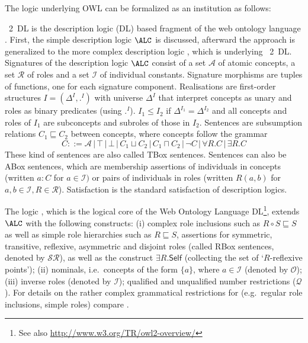 \documentclass[10pt, a4paper]{isov2}
\makeatletter
\newcommand*\CommentAuthor{}
\renewcommand*\CommentAuthor{#1}}
\newcommand*\CommentDate{}
\renewcommand*\CommentDate{#1}}
\newcommand*\CommentId{}
\renewcommand*\CommentId{#1}}
\newcommand*\CommentType{}
\renewcommand*\CommentType{#1}}
\newcommand*{\SetCommentColorByType}[1]{%
\edef\localType{{#1}}%
\expandafter\ifstrequal\localType{q-aut}{\colorlet{CommentColor}{red}}{%
\expandafter\ifstrequal\localType{q-all}{\colorlet{CommentColor}{orange}}{%
\expandafter\ifstrequal\localType{todo}{\colorlet{CommentColor}{orange}}{%
\expandafter\ifstrequal\localType{fyi}{\colorlet{CommentColor}{lightgray}}{%
\colorlet{CommentColor}{yellow}}}}}}
\newcommand*{\SetCommentPrefixByType}[1]{%
\edef\localType{{#1}}%
\expandafter\@ifmtarg\localType{%
\edef\CommentPrefix{}%
}{%
\caseupper[q]{#1}%
\edef\CommentPrefix{\thestring: }%
}}
\newcommand*{\initComment}[1]{%
\setkeys{Comment}{#1}%
\SetCommentColorByType{\CommentType}%
\relax%
\SetCommentPrefixByType{\CommentType}%
\relax%
}
\newcommand*{\todonote}[2][]{%
\initComment{#1}%
\pdfcomment[author=\CommentAuthor,color=CommentColor,date=\CommentDate,id=\CommentId]{%
\CommentPrefix
#2}}
\renewcommand*{\todonote}[2][]{%
\initComment{#1}%
\ednote{\CommentPrefix #2}}
\newcommand*{\CLnote}[2][author=Christoph Lange]{%
\todonote[author=Christoph Lange,#1]{#2}}
\newcommand*{\DOL}{\ensuremath{\mathsf{DOL}}\xspace}
\makeatother
\begin{document}
\sclause{Semantic Conformance of OWL 2 With \DOL}\label{a:owl-logic}


 The logic \SROIQ underlying 
OWL can be formalized as an institution as follows:
\begin{definition}\label{DL}  
\OWL~2~DL is the description logic (DL) based fragment of the web ontology language \OWL. 
 First, the simple description logic $\ALC$ is discussed, afterward the approach is generalized
to the more complex description logic \SROIQ{}, which is underlying \OWL~2~DL.
Signatures of the description logic $\ALC$ consist of a set  ${\mathcal A}$ of
atomic concepts, a set ${\mathcal R}$ of roles and a set ${\mathcal
I}$ of individual constants. Signature morphisms are tuples of
functions, one for each signature component.
Realisations are  first-order structures $I = (\Delta^I, .^I)$ with universe $\Delta^I$
that interpret concepts as unary and roles as binary predicates
(using $.^I$). $I_1\leq I_2$ if $\Delta^{I_1}=\Delta^{I_2}$ and all
concepts and roles of $I_1$ are subconcepts and subroles of those in $I_2$.
Sentences are subsumption relations $C_1\sqsubseteq C_2$ between
concepts, where concepts follow the grammar
$$C ::= {\mathcal A} \,|\, \top\,|\, \bot \,|\, C_1 \sqcup C_2 \,|\, C_1 \sqcap C_2 \,|\, \neg C 
    \,|\, \forall R . C \,|\, \exists R . C$$
These kind of sentences are also called TBox sentences.
 Sentences can also be ABox sentences, which are
membership assertions of individuals in concepts (written $a:C$ for
$a\in{\mathcal I})$ or pairs of individuals in roles (written $R(a,b)$
for $a,b\in{\mathcal I}, R\in{\mathcal R}$).   Satisfaction is the
standard satisfaction of description logics.

The logic \SROIQ \cite{SROIQ}, which is the logical core of the Web Ontology
Language  DL\footnote{See also \url{http://www.w3.org/TR/owl2-overview/}}, extends $\ALC$
with the following constructs: (i) complex role inclusions such as $R \circ S \sqsubseteq S$
as well as simple role hierarchies such as $R \sqsubseteq S$,
assertions for symmetric, transitive, reflexive, asymmetric and
disjoint roles (called RBox sentences, denoted by $\mathcal{SR}$), as well as the construct
$\exists R . \mathsf{Self}$ (collecting the set of `$R$-reflexive
points'); (ii) nominals, i.e.\ concepts of the form $\{a\}$, where $a\in\mathcal{I}$ (denoted by $\mathcal{O}$); (iii) inverse
roles (denoted by $\mathcal{I}$); qualified and unqualified number
restrictions ($\mathcal{Q}$). For details on the rather complex
grammatical restrictions for \SROIQ (e.g.\ regular role inclusions,
simple roles) compare \cite{SROIQ}.


\end{definition}
\end{document}
